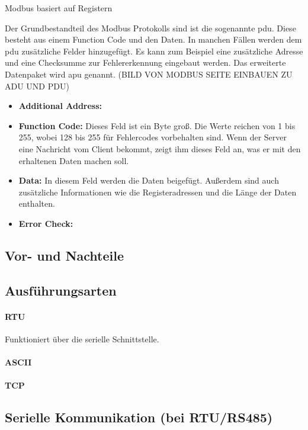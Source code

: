 Modbus basiert auf Registern 

Der Grundbestandteil des Modbus Protokolls sind ist die sogenannte \acf{pdu}. Diese besteht aus einem Function Code und den Daten. In manchen Fällen werden dem \acs{pdu} zusätzliche Felder hinzugefügt. Es kann zum Beispiel eine zusätzliche Adresse und eine Checksumme zur Fehlererkennung eingebaut werden. Das erweiterte Datenpaket wird \acf{apu} genannt.
(BILD VON MODBUS SEITE EINBAUEN ZU ADU UND PDU)
\begin{itemize}
	\item \textbf{Additional Address:}
	\item \textbf{Function Code:} Dieses Feld ist ein Byte groß. Die Werte reichen von 1 bis 255, wobei 128 bis 255 für Fehlercodes vorbehalten sind. Wenn der Server eine Nachricht vom Client bekommt, zeigt ihm dieses Feld an, was er mit den erhaltenen Daten machen soll. 
	\item \textbf{Data:} In diesem Feld werden die Daten beigefügt. Außerdem sind  auch zusätzliche Informationen wie die Registeradressen und die Länge der Daten enthalten.
	\item \textbf{Error Check:}
\end{itemize}


\cite{Modbus_Organization_AP:2012}

\subsection{Vor- und Nachteile}


\subsection{Ausführungsarten}
\paragraph{RTU}
Funktioniert über die serielle Schnittstelle.
\paragraph{ASCII}
\paragraph{TCP}

\subsection{Serielle Kommunikation (bei RTU/RS485)}


